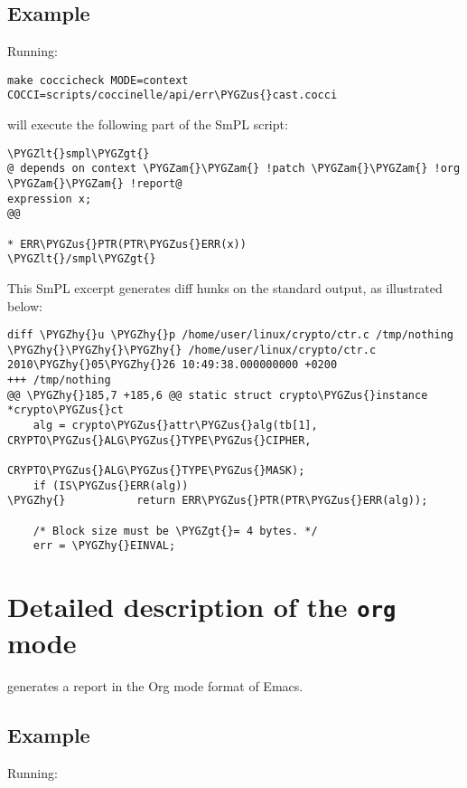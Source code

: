 \documentclass[a4paper,8pt,english]{sphinxmanual}
\def\PYGZus{\char`\_}
\def\PYGZam{\char`\&}
\def\PYGZlt{\char`\<}
\def\PYGZgt{\char`\>}
\def\PYGZhy{\char`\-}
\begin{document}
\subsection{Example}
\label{dev-tools/coccinelle:id2}
Running:

\begin{Verbatim}[commandchars=\\\{\}]
make coccicheck MODE=context COCCI=scripts/coccinelle/api/err\PYGZus{}cast.cocci
\end{Verbatim}

will execute the following part of the SmPL script:

\begin{Verbatim}[commandchars=\\\{\}]
\PYGZlt{}smpl\PYGZgt{}
@ depends on context \PYGZam{}\PYGZam{} !patch \PYGZam{}\PYGZam{} !org \PYGZam{}\PYGZam{} !report@
expression x;
@@

* ERR\PYGZus{}PTR(PTR\PYGZus{}ERR(x))
\PYGZlt{}/smpl\PYGZgt{}
\end{Verbatim}

This SmPL excerpt generates diff hunks on the standard output, as
illustrated below:

\begin{Verbatim}[commandchars=\\\{\}]
diff \PYGZhy{}u \PYGZhy{}p /home/user/linux/crypto/ctr.c /tmp/nothing
\PYGZhy{}\PYGZhy{}\PYGZhy{} /home/user/linux/crypto/ctr.c   2010\PYGZhy{}05\PYGZhy{}26 10:49:38.000000000 +0200
+++ /tmp/nothing
@@ \PYGZhy{}185,7 +185,6 @@ static struct crypto\PYGZus{}instance *crypto\PYGZus{}ct
    alg = crypto\PYGZus{}attr\PYGZus{}alg(tb[1], CRYPTO\PYGZus{}ALG\PYGZus{}TYPE\PYGZus{}CIPHER,
                              CRYPTO\PYGZus{}ALG\PYGZus{}TYPE\PYGZus{}MASK);
    if (IS\PYGZus{}ERR(alg))
\PYGZhy{}           return ERR\PYGZus{}PTR(PTR\PYGZus{}ERR(alg));

    /* Block size must be \PYGZgt{}= 4 bytes. */
    err = \PYGZhy{}EINVAL;
\end{Verbatim}


\section{Detailed description of the \texttt{org} mode}
\label{dev-tools/coccinelle:detailed-description-of-the-org-mode}
 generates a report in the Org mode format of Emacs.


\subsection{Example}
\label{dev-tools/coccinelle:id3}
Running:
\end{document}
